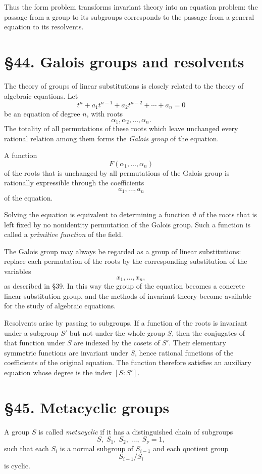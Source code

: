 \documentclass[11pt,a4paper]{book}
\newcommand{\webersection}[2]{\clearpage\section*{\S #1. #2}}
\begin{document}
Thus the form problem transforms invariant theory into an equation problem: the passage from a group to its subgroups corresponds to the passage from a general equation to its resolvents.

\webersection{44}{Galois groups and resolvents}

The theory of groups of linear substitutions is closely related to the theory of algebraic equations.  Let
\begin{equation}
t^n+a_1t^{n-1}+a_2t^{n-2}+\cdots+a_n=0
\end{equation}
be an equation of degree \(n\), with roots
\[
\alpha_1,\alpha_2,\ldots,\alpha_n.
\]
The totality of all permutations of these roots which leave unchanged every rational relation among them forms the \emph{Galois group} of the equation.

A function
\[
F(\alpha_1,\ldots,\alpha_n)
\]
of the roots that is unchanged by all permutations of the Galois group is rationally expressible through the coefficients
\[
a_1,\ldots,a_n
\]
of the equation.

Solving the equation is equivalent to determining a function \(\vartheta\) of the roots that is left fixed by no nonidentity permutation of the Galois group.  Such a function is called a \emph{primitive function} of the field.

The Galois group may always be regarded as a group of linear substitutions: replace each permutation of the roots by the corresponding substitution of the variables
\[
x_1,\ldots,x_n,
\]
as described in \S 39.  In this way the group of the equation becomes a concrete linear substitution group, and the methods of invariant theory become available for the study of algebraic equations.

Resolvents arise by passing to subgroups.  If a function of the roots is invariant under a subgroup \(S'\) but not under the whole group \(S\), then the conjugates of that function under \(S\) are indexed by the cosets of \(S'\).  Their elementary symmetric functions are invariant under \(S\), hence rational functions of the coefficients of the original equation.  The function therefore satisfies an auxiliary equation whose degree is the index \([S:S']\).

\webersection{45}{Metacyclic groups}

A group \(S\) is called \emph{metacyclic} if it has a distinguished chain of subgroups
\begin{equation}
S,\; S_1,\; S_2,\;\ldots,\; S_\nu=1,
\end{equation}
such that each \(S_i\) is a normal subgroup of \(S_{i-1}\) and each quotient group
\[
S_{i-1}/S_i
\]
is cyclic.
\end{document}
